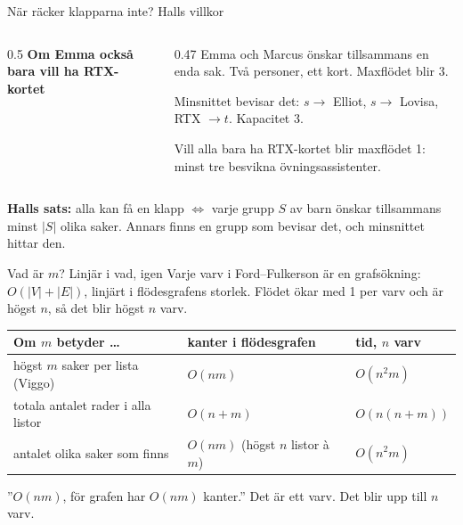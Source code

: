 

\begin{frame}{När räcker klapparna inte? Halls villkor}
\begin{columns}[T]
\begin{column}{0.5\textwidth}
\centering
{\footnotesize\bfseries\color{plum}Om Emma också bara vill ha RTX-kortet}\par\smallskip

\end{column}
\begin{column}{0.47\textwidth}
\small
Emma och Marcus önskar tillsammans en enda sak. Två personer, ett kort. Maxflödet blir 3.\par\smallskip
Minsnittet bevisar det: $s\to$ Elliot, $s\to$ Lovisa, RTX $\to t$. Kapacitet 3.\par\smallskip
Vill alla bara ha RTX-kortet blir maxflödet 1: minst tre besvikna övningsassistenter.
\end{column}
\end{columns}
\vfill
\begin{ahabox}
\textbf{Halls sats:} alla kan få en klapp $\iff$ varje grupp $S$ av barn önskar tillsammans minst
$|S|$ olika saker. Annars finns en grupp som bevisar det, och minsnittet hittar den.
\end{ahabox}
\end{frame}

\begin{frame}{Vad är $m$? Linjär i vad, igen}
\small
Varje varv i Ford--Fulkerson är en grafsökning: $O(|V|+|E|)$, linjärt i flödesgrafens storlek.
Flödet ökar med 1 per varv och är högst $n$, så det blir högst $n$ varv.
\medskip

\footnotesize
\renewcommand{\arraystretch}{1.25}
\begin{tabularx}{\textwidth}{@{}Xll@{}}
\toprule
\textbf{Om $m$ betyder \dots} & \textbf{kanter i flödesgrafen} & \textbf{tid, $n$ varv}\\
\midrule
högst $m$ saker per lista (Viggo) & $O(nm)$ & $O(n^2m)$\\
totala antalet rader i alla listor & $O(n+m)$ & $O(n(n+m))$\\
antalet olika saker som finns & $O(nm)$ (högst $n$ listor à $m$) & $O(n^2m)$\\
\bottomrule
\end{tabularx}
\medskip
\begin{missbox}
”$O(nm)$, för grafen har $O(nm)$ kanter.” Det är ett varv. Det blir upp till $n$ varv.
\end{missbox}
\end{frame}

